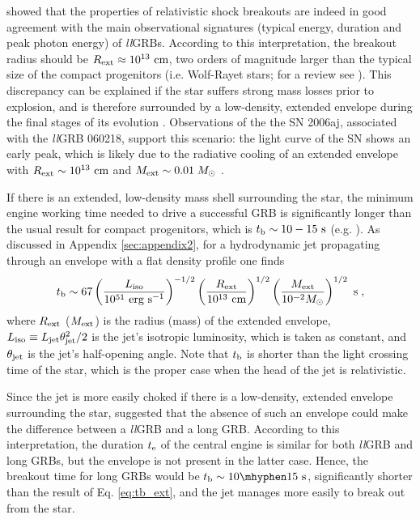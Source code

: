 \documentclass[useAMS,usenatbib]{mn2e}
\begin{document}
\citet{NakarSari2012} showed that the properties of relativistic shock breakouts are indeed in good agreement with the main observational signatures (typical energy, duration and peak photon energy) of {\it ll}GRBs. According to this interpretation, the breakout radius should be $R_{\rm ext}\approx 10^{13}\text{ cm}$, two orders of magnitude larger than the typical size of the compact progenitors (i.e. Wolf-Rayet stars; for a review see \citealt{Crowther2007}). This discrepancy can be explained if the star suffers strong mass losses prior to explosion, and is therefore surrounded by a low-density, extended envelope during the final stages of its evolution \citep{Margutti2015, Nakar2015}. Observations of the the SN 2006aj, associated with the {\it ll}GRB 060218, support this scenario: the light curve of the SN shows an early peak, which is likely due to the radiative cooling of an extended envelope with $R_{\rm ext}\sim 10^{13}\text{ cm}$ and $M_{\rm ext}\sim 0.01\;M_\odot$ \citep{Nakar2015}.

If there is an extended, low-density mass shell surrounding the star, the minimum engine working time needed to drive a successful GRB is significantly longer than the usual result for compact progenitors, which is $t_{\rm b}\sim 10-15\text{ s}$ (e.g. \citealt{Bromberg2011,Bromberg2015}). As discussed in Appendix \ref{sec:appendix2}, for a hydrodynamic jet propagating through an envelope with a flat density profile one finds
\begin{equation}
\label{eq:tb_ext}
t_{\rm b}\sim 67\left(\frac{L_{\rm iso}}{10^{51}\text{ erg s$^{-1}$}}\right)^{-1/2} \left(\frac{R_{\rm ext}}{10^{13}\text{ cm}}\right)^{1/2} \left(\frac{M_{\rm ext}}{10^{-2}M_\odot}\right)^{1/2}\text{ s}\;,
\end{equation}
where $R_{\rm ext}$ ($M_{\rm ext}$) is the radius (mass) of the extended envelope, $L_{\rm iso}\equiv L_{\rm jet}\theta_{\rm jet}^2/2$ is the jet's isotropic luminosity, which is taken as constant, and $\theta_{\rm jet}$ is the jet's half-opening angle. Note that $t_{\rm b}$ is shorter than the light crossing time of the star, which is the proper case when the head of the jet is relativistic.

Since the jet is more easily choked if there is a low-density, extended envelope surrounding the star, \citet{Nakar2015} suggested that the absence of such an envelope could make the difference between  a {\it ll}GRB and a long GRB. According to this interpretation, the duration $t_{\rm e}$ of the central engine is similar for both {\it ll}GRB and long GRBs, but the envelope is not present in the latter case. Hence, the breakout time for long GRBs would be $t_{\rm b}\sim 10\mhyphen15\text{ s}$, significantly shorter than the result of Eq. \eqref{eq:tb_ext}, and the jet manages more easily to break out from the star.
\end{document}
